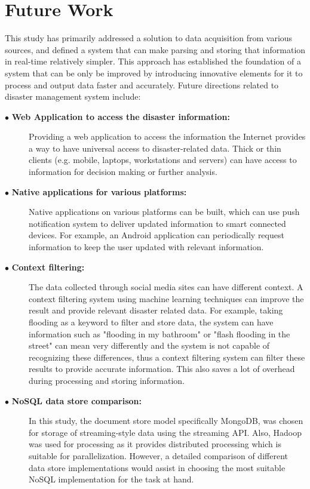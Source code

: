 \chapter{Future Work}

This study has primarily addressed a solution to data acquisition from various sources, and defined a system that can make parsing and storing that information in real-time relatively simpler. This approach has established the foundation of a system that can be only be improved by introducing innovative elements for it to process and output data faster and accurately. Future directions related to disaster management system include:

\begin{description}
	\item[$\bullet$ \textbf{Web Application to access the disaster information:}]
	\hfill\break
	Providing a web application to access the information the Internet provides a way to have universal access to disaster-related data. Thick or thin clients (e.g. mobile, laptops, workstations and servers) can have access to information for decision making or further analysis.
	
	\item[$\bullet$ \textbf{Native applications for various platforms:}]
	\hfill\break
	Native applications on various platforms can be built, which can use push notification system to deliver updated information to smart connected devices. For example, an Android application can periodically request information to keep the user updated with relevant information.

	\item[$\bullet$ \textbf{Context filtering:}]
	\hfill\break
	The data collected through social media sites can have different context. A context filtering system using machine learning techniques can improve the result and provide relevant disaster related data. For example, taking flooding as a keyword to filter and store data, the system can have information such as "flooding in my bathroom" or "flash flooding in the street" can mean very differently and the system is not capable of recognizing these differences, thus a context filtering system can filter these results to provide accurate information. This also saves a lot of overhead during processing and storing information.

	\item[$\bullet$ \textbf{NoSQL data store comparison:}]
	\hfill\break
	In this study, the document store model specifically MongoDB, was chosen for storage of streaming-style data using the streaming API. Also, Hadoop was used for processing as it provides distributed processing which is suitable for parallelization. However, a detailed comparison of different data store implementations would assist in choosing the most suitable NoSQL implementation for the task at hand.


\end{description}
